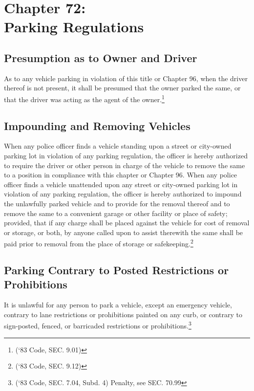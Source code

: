 \chapter*{Chapter 72: \\
	Parking Regulations}
    \vfill
    \minitoc
    \pagebreak



\section{Presumption as to Owner and Driver}
As to any vehicle parking in violation of this title or Chapter 96, when the driver thereof is not present, it shall be presumed that the owner parked the same, or that the driver was acting as the agent of the owner.\footnote{(‘83 Code, SEC. 9.01)}

\section{Impounding and Removing Vehicles}
When any police officer finds a vehicle standing upon a street or city-owned parking lot in violation of any parking regulation, the officer is hereby authorized to require the driver or other person in charge of the vehicle to remove the same to a position in compliance with this chapter or Chapter 96. When any police officer finds a vehicle unattended upon any street or city-owned parking lot in violation of any parking regulation, the officer is hereby authorized to impound the unlawfully parked vehicle and to provide for the removal thereof and to remove the same to a convenient garage or other facility or place of safety; provided, that if any charge shall be placed against the vehicle for cost of removal or storage, or both, by anyone called upon to assist therewith the same shall be paid prior to removal from the place of storage or safekeeping.\footnote{(‘83 Code, SEC. 9.12)}\\



\setcounter{section}{14}
\section{Parking Contrary to Posted Restrictions or Prohibitions}
It is unlawful for any person to park a vehicle, except an emergency vehicle, contrary to lane restrictions or prohibitions painted on any curb, or contrary to sign-posted, fenced, or barricaded restrictions or prohibitions.\footnote{(‘83 Code, SEC. 7.04, Subd. 4)  Penalty, see SEC. 70.99}

